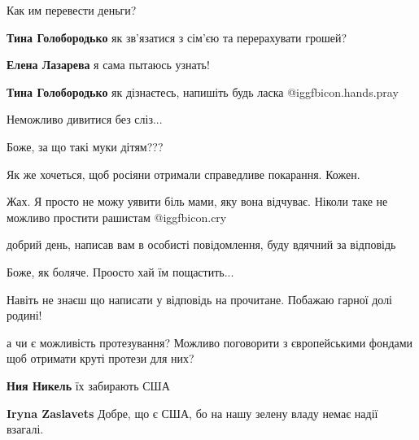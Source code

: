  
 
 
 
 
\zzSecCmt

\begin{itemize} %
Как им перевести деньги?

\begin{itemize} %
\textbf{Тина Голобородько} як зв'язатися з сім'єю та перерахувати грошей?

\textbf{Елена Лазарева} я сама пытаюсь узнать!

\textbf{Тина Голобородько} як дізнаєтесь, напишіть будь ласка @igg{fbicon.hands.pray} 
\end{itemize} %

Неможливо дивитися без сліз...

Боже, за що такі муки дітям???

Як же хочеться, щоб росіяни отримали справедливе покарання. Кожен.

Жах. Я просто не можу уявити біль мами, яку вона відчуває.
Ніколи таке не можливо простити рашистам  @igg{fbicon.cry} 

добрий день, написав вам в особисті повідомлення, буду вдячний за відповідь

Боже, як боляче. Проосто хай їм пощастить...

Навіть не знаєш що написати у відповідь на прочитане. Побажаю гарної долі родині!


а чи є можливість протезування? Можливо поговорити з європейськими фондами щоб
отримати круті протези для них?

\begin{itemize} %
\textbf{Ния Никель} їх забирають США

\textbf{Iryna Zaslavets} Добре, що є США, бо на нашу зелену владу немає надії взагалі.
\end{itemize} %


\end{itemize}
